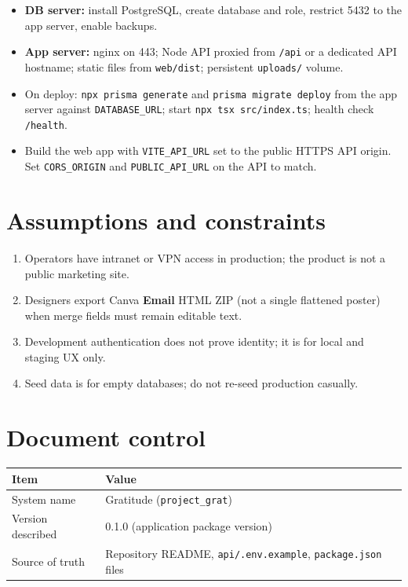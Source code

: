 \documentclass[11pt,a4paper]{article}
\begin{document}
\begin{itemize}[leftmargin=1.4em]
  \item \textbf{DB server:} install PostgreSQL, create database and role, restrict 5432 to the app server, enable backups.
  \item \textbf{App server:} nginx on 443; Node API proxied from \texttt{/api} or a dedicated API hostname; static files from \texttt{web/dist}; persistent \texttt{uploads/} volume.
  \item On deploy: \texttt{npx prisma generate} and \texttt{prisma migrate deploy} from the app server against \texttt{DATABASE\_URL}; start \texttt{npx tsx src/index.ts}; health check \texttt{/health}.
  \item Build the web app with \texttt{VITE\_API\_URL} set to the public HTTPS API origin. Set \texttt{CORS\_ORIGIN} and \texttt{PUBLIC\_API\_URL} on the API to match.
\end{itemize}

\section{Assumptions and constraints}
\begin{enumerate}[leftmargin=1.6em]
  \item Operators have intranet or VPN access in production; the product is not a public marketing site.
  \item Designers export Canva \textbf{Email} HTML ZIP (not a single flattened poster) when merge fields must remain editable text.
  \item Development authentication does not prove identity; it is for local and staging UX only.
  \item Seed data is for empty databases; do not re-seed production casually.
\end{enumerate}

\section{Document control}
\begin{tabularx}{\textwidth}{lX}
  \toprule
  \textbf{Item} & \textbf{Value} \\
  \midrule
  System name & Gratitude (\texttt{project\_grat}) \\
  Version described & 0.1.0 (application package version) \\
  Source of truth & Repository README, \texttt{api/.env.example}, \texttt{package.json} files \\
  \bottomrule
\end{tabularx}
\end{document}
